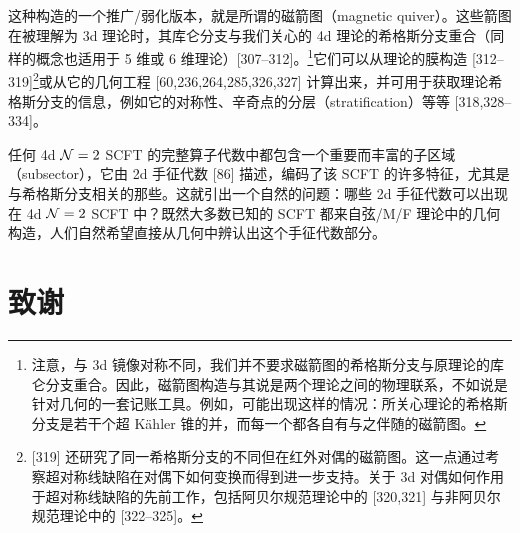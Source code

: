 
这种构造的一个推广/弱化版本，就是所谓的磁箭图（magnetic quiver）。这些箭图在被理解为 3d 理论时，其库仑分支与我们关心的 4d 理论的希格斯分支重合（同样的概念也适用于 5 维或 6 维理论）[307--312]。\footnote{注意，与 3d 镜像对称不同，我们并不要求磁箭图的希格斯分支与原理论的库仑分支重合。因此，磁箭图构造与其说是两个理论之间的物理联系，不如说是针对几何的一套记账工具。例如，可能出现这样的情况：所关心理论的希格斯分支是若干个超 Kähler 锥的并，而每一个都各自有与之伴随的磁箭图。}它们可以从理论的膜构造 [312--319]\footnote{[319] 还研究了同一希格斯分支的不同但在红外对偶的磁箭图。这一点通过考察超对称线缺陷在对偶下如何变换而得到进一步支持。关于 3d 对偶如何作用于超对称线缺陷的先前工作，包括阿贝尔规范理论中的 [320,321] 与非阿贝尔规范理论中的 [322--325]。}或从它的几何工程 [60,236,264,285,326,327] 计算出来，并可用于获取理论希格斯分支的信息，例如它的对称性、辛奇点的分层（stratification）等等 [318,328--334]。

任何 4d $\mathcal{N}=2$ SCFT 的完整算子代数中都包含一个重要而丰富的子区域（subsector），它由 2d 手征代数 [86] 描述，编码了该 SCFT 的许多特征，尤其是与希格斯分支相关的那些。这就引出一个自然的问题：哪些 2d 手征代数可以出现在 4d $\mathcal{N}=2$ SCFT 中？既然大多数已知的 SCFT 都来自弦/M/F 理论中的几何构造，人们自然希望直接从几何中辨认出这个手征代数部分。


\section*{致谢}

